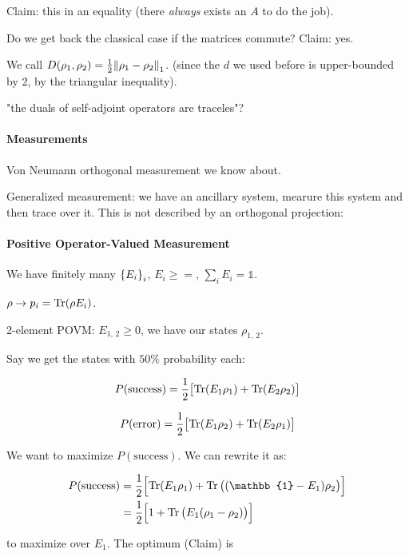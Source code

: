 Claim: this in an equality (there \emph{always} exists an $A$ to do the job).

Do we get back the classical case if the matrices commute? Claim: yes.

We call \(D(\rho_1, \rho_2) = \frac{1}{2} \norm{\rho_1 - \rho_2}_1\). (since the $d$ we used before is upper-bounded by 2, by the triangular inequality).

"the duals of self-adjoint operators are traceles"?

\paragraph{Measurements}
Von Neumann orthogonal measurement we know about.

Generalized measurement: we have an ancillary system, mearure this system and then trace over it. This is not described by an orthogonal projection:

\paragraph{Positive Operator-Valued Measurement}

We have finitely many \(\qty{E_i}_i\), \(E_i \geq =\),  \(\sum_i E_i = \mathbb{1}\).

\(\rho \rightarrow p_i = \Tr (\rho E_i)\).

2-element POVM: \(E_{1, \, 2} \geq 0\), we have our states \(\rho_{1, \, 2}\).

Say we get the states with \(50\%\) probability each:

\begin{equation}
  P(\text{success}) = \frac{1}{2} \qty[\Tr(E_1 \rho_1) + \Tr(E_2 \rho_2)]
\end{equation}

\begin{equation}
  P(\text{error}) = \frac{1}{2} \qty[\Tr(E_1 \rho_2) + \Tr(E_2 \rho_1)]
\end{equation}

We want to maximize \(P(\text{success})\). We can rewrite it as:

\begin{align}
  P(\text{success}) &= \frac{1}{2} \qty[\Tr(E_1 \rho_1) + \Tr\qty((\mathbb{1} - E_1) \rho_2)] \\
  &= \frac{1}{2}\qty[1 + \Tr \qty(E_1 (\rho_1 - \rho_2))]
\end{align}

to maximize over $E_1$. The optimum (Claim) is

